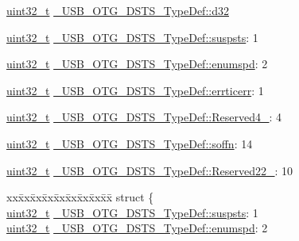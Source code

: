 \begin{DoxyCompactItemize}
\begin{tabbing}
\end{tabbing}\item 
\hyperlink{stdint_8h_a435d1572bf3f880d55459d9805097f62}{uint32\-\_\-t} \hyperlink{group___u_s_b___o_t_g___d_r_i_v_e_r_ga737954fcf78fc0cf776ed36505e4b082}{\-\_\-\-U\-S\-B\-\_\-\-O\-T\-G\-\_\-\-D\-S\-T\-S\-\_\-\-Type\-Def\-::d32}
\item 
\hyperlink{stdint_8h_a435d1572bf3f880d55459d9805097f62}{uint32\-\_\-t} \hyperlink{group___u_s_b___o_t_g___d_r_i_v_e_r_ga0b1f01a9acba3c6227e95efe0b677faa}{\-\_\-\-U\-S\-B\-\_\-\-O\-T\-G\-\_\-\-D\-S\-T\-S\-\_\-\-Type\-Def\-::suspsts}\-: 1
\item 
\hyperlink{stdint_8h_a435d1572bf3f880d55459d9805097f62}{uint32\-\_\-t} \hyperlink{group___u_s_b___o_t_g___d_r_i_v_e_r_gae7ed8264debc9dd05d3933b3e4b05216}{\-\_\-\-U\-S\-B\-\_\-\-O\-T\-G\-\_\-\-D\-S\-T\-S\-\_\-\-Type\-Def\-::enumspd}\-: 2
\item 
\hyperlink{stdint_8h_a435d1572bf3f880d55459d9805097f62}{uint32\-\_\-t} \hyperlink{group___u_s_b___o_t_g___d_r_i_v_e_r_ga1b4282c2381173d21b6fea82cb38f5b0}{\-\_\-\-U\-S\-B\-\_\-\-O\-T\-G\-\_\-\-D\-S\-T\-S\-\_\-\-Type\-Def\-::errticerr}\-: 1
\item 
\hyperlink{stdint_8h_a435d1572bf3f880d55459d9805097f62}{uint32\-\_\-t} \hyperlink{group___u_s_b___o_t_g___d_r_i_v_e_r_gae8553a9ded2154d81ebcdd5e005839ac}{\-\_\-\-U\-S\-B\-\_\-\-O\-T\-G\-\_\-\-D\-S\-T\-S\-\_\-\-Type\-Def\-::\-Reserved4\-\_}\-: 4
\item 
\hyperlink{stdint_8h_a435d1572bf3f880d55459d9805097f62}{uint32\-\_\-t} \hyperlink{group___u_s_b___o_t_g___d_r_i_v_e_r_ga5416ffe4780ad95cc3dfb9bee8549ab8}{\-\_\-\-U\-S\-B\-\_\-\-O\-T\-G\-\_\-\-D\-S\-T\-S\-\_\-\-Type\-Def\-::soffn}\-: 14
\item 
\hyperlink{stdint_8h_a435d1572bf3f880d55459d9805097f62}{uint32\-\_\-t} \hyperlink{group___u_s_b___o_t_g___d_r_i_v_e_r_ga021644a5a39c1bdab5a7d0df8ea058be}{\-\_\-\-U\-S\-B\-\_\-\-O\-T\-G\-\_\-\-D\-S\-T\-S\-\_\-\-Type\-Def\-::\-Reserved22\-\_}\-: 10
\item 
\begin{tabbing}
xx\=xx\=xx\=xx\=xx\=xx\=xx\=xx\=xx\=\kill
struct \{\\
\>\hyperlink{stdint_8h_a435d1572bf3f880d55459d9805097f62}{uint32\_t} \hyperlink{group___u_s_b___o_t_g___d_r_i_v_e_r_ga0b1f01a9acba3c6227e95efe0b677faa}{\_USB\_OTG\_DSTS\_TypeDef::suspsts}: 1\\
\>\hyperlink{stdint_8h_a435d1572bf3f880d55459d9805097f62}{uint32\_t} \hyperlink{group___u_s_b___o_t_g___d_r_i_v_e_r_gae7ed8264debc9dd05d3933b3e4b05216}{\_USB\_OTG\_DSTS\_TypeDef::enumspd}: 2\\

\end{tabbing}
\end{DoxyCompactItemize}
